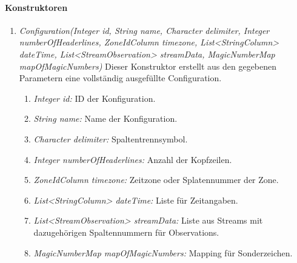 \paragraph{Konstruktoren}
\begin{enumerate}[+]
	\item \textit{Configuration(Integer id, String name, Character delimiter, Integer numberOfHeaderlines, ZoneIdColumn timezone, List<StringColumn> dateTime, List<StreamObservation> streamData, MagicNumberMap mapOfMagicNumbers)} Dieser Konstruktor erstellt aus den gegebenen Parametern eine vollständig ausgefüllte Configuration.
	\begin{enumerate}[$\bullet$]
		\item \textit{Integer id:} ID der Konfiguration.
		\item \textit{String name:} Name der Konfiguration.
		\item \textit{Character delimiter:} Spaltentrennsymbol.
		\item \textit{Integer numberOfHeaderlines:} Anzahl der Kopfzeilen.
		\item \textit{ZoneIdColumn timezone:} Zeitzone oder Splatennummer der Zone.
		\item \textit{List<StringColumn> dateTime:} Liste für Zeitangaben.
		\item \textit{List<StreamObservation> streamData:} Liste aus Streams mit dazugehörigen Spaltennummern für Observations.
		\item \textit{MagicNumberMap mapOfMagicNumbers:} Mapping für Sonderzeichen.
	\end{enumerate}
\end{enumerate}

